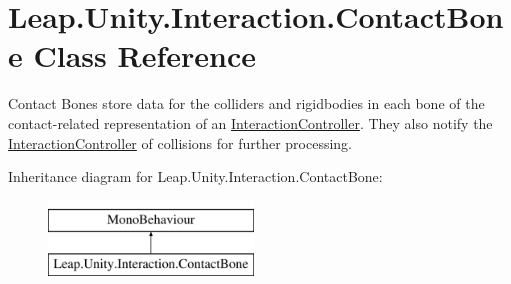 \hypertarget{class_leap_1_1_unity_1_1_interaction_1_1_contact_bone}{}\section{Leap.\+Unity.\+Interaction.\+Contact\+Bone Class Reference}
\label{class_leap_1_1_unity_1_1_interaction_1_1_contact_bone}


Contact Bones store data for the colliders and rigidbodies in each bone of the contact-\/related representation of an \mbox{\hyperlink{class_leap_1_1_unity_1_1_interaction_1_1_interaction_controller}{Interaction\+Controller}}. They also notify the \mbox{\hyperlink{class_leap_1_1_unity_1_1_interaction_1_1_interaction_controller}{Interaction\+Controller}} of collisions for further processing.  


Inheritance diagram for Leap.\+Unity.\+Interaction.\+Contact\+Bone\+:\begin{figure}[H]
\begin{center}
\leavevmode
\includegraphics[height=2.000000cm]{class_leap_1_1_unity_1_1_interaction_1_1_contact_bone}
\end{center}
\end{figure}

